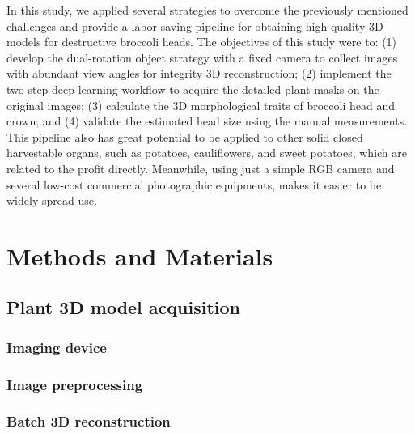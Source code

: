 In this study, we applied several strategies to overcome the previously mentioned challenges and provide a labor-saving pipeline for obtaining high-quality 3D models for destructive broccoli heads. The objectives of this study were to: (1) develop the dual-rotation object strategy with a fixed camera to collect images with abundant view angles for integrity 3D reconstruction; (2) implement the two-step deep learning workflow to acquire the detailed plant masks on the original images; (3) calculate the 3D morphological traits of broccoli head and crown; and (4) validate the estimated head size using the manual measurements. This pipeline also has great potential to be applied to other solid closed harvestable organs, such as potatoes, cauliflowers, and sweet potatoes, which are related to the profit directly. Meanwhile, using just a simple RGB camera and several low-cost commercial photographic equipments, makes it easier to be widely-spread use.


\section{Methods and Materials}

\subsection{Plant 3D model acquisition}


\subsubsection{Imaging device}



\subsubsection{Image preprocessing}



\subsubsection{Batch 3D reconstruction}



